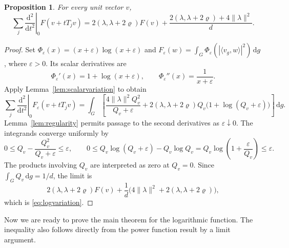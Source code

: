 \documentclass[11pt,reqno]{amsart}
\numberwithin{equation}{section}
\theoremstyle{plain}
\newtheorem{proposition}[theorem]{Proposition}
\theoremstyle{remark}
\newcommand{\rh}{\varrho}
\newcommand{\dd}{\,\mathrm d}
\newcommand{\norm}[1]{\lVert#1\rVert}
\newcommand{\ip}[2]{\langle#1,#2\rangle}
\begin{document}
\begin{proposition}\label{prop:variation}
For every unit vector $v$,
\begin{equation}\label{eq:logvariation}
 \sum_j\left.\frac{\mathrm d^2}{\mathrm dt^2}\right|_0F(v+tT_jv)
 =2(\lambda,\lambda+2\rh)F(v)+\frac{2(\lambda,\lambda+2\rh)+4\norm{\lambda}^2}{d}.
\end{equation}
\end{proposition}
\begin{proof}
Set $\Phi_\varepsilon(x)=(x+\varepsilon)\log(x+\varepsilon)$ and
$F_\varepsilon(w)=\int_G\Phi_\varepsilon(|\ip{v_g}{w}|^2)\dd g$, where $\varepsilon>0$.
Its scalar derivatives are
\[
 \Phi_\varepsilon'(x)=1+\log(x+\varepsilon),\qquad
 \Phi_\varepsilon''(x)=\frac1{x+\varepsilon}.
\]
Apply Lemma~\ref{lem:scalarvariation} to obtain
\begin{equation}\label{eq:regularizedvariation}
 \sum_j\left.\frac{\mathrm d^2}{\mathrm dt^2}\right|_0F_\varepsilon(v+tT_jv)
 =\int_G\left[\frac{4\norm{\lambda}^2Q_v^2}{Q_v+\varepsilon}
 +2(\lambda,\lambda+2\rh)Q_v\bigl(1+\log(Q_v+\varepsilon)\bigr)\right]\dd g.
\end{equation}
Lemma~\ref{lem:regularity} permits passage to the second derivatives
as $\varepsilon\downarrow0$. The integrands converge uniformly by
\[
 0\le Q_v-\frac{Q_v^2}{Q_v+\varepsilon}\le\varepsilon,
 \qquad
 0\le Q_v\log(Q_v+\varepsilon)-Q_v\log Q_v
 =Q_v\log\!\left(1+\frac{\varepsilon}{Q_v}\right)\le\varepsilon.
\]
The products involving $Q_v$ are interpreted as zero at $Q_v=0$.
Since $\int_GQ_v\dd g=1/d$, the limit is
\[
 2(\lambda,\lambda+2\rh)F(v)
 +\frac1d\bigl(4\norm{\lambda}^2+2(\lambda,\lambda+2\rh)\bigr),
\]
which is \eqref{eq:logvariation}.
\end{proof}

Now we are ready to prove the main theorem for the logarithmic function.
The inequality also follows directly from the power function result by a limit argument.
\end{document}
